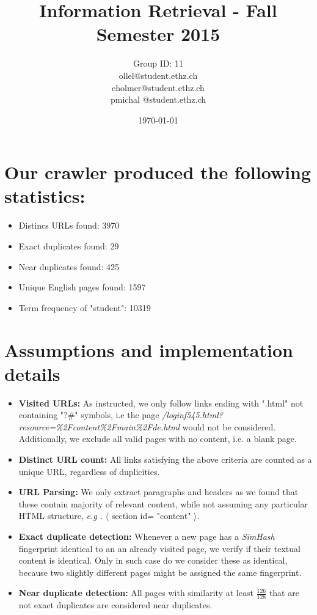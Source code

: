 \documentclass[a4paper, 11pt]{article}
\begin{document}
\title{Information Retrieval - Fall Semester 2015}
\author{Group ID: 11 \\ ollel@student.ethz.ch\\ eholmer@student.ethz.ch\\ pmichal
@student.ethz.ch\\}
\date{\today}
\maketitle

\section*{Our crawler produced the following statistics: } 
\begin{itemize}
  \item Distincs URLs found: 3970
  \item Exact duplicates found: 29
  \item Near duplicates found: 425
  \item Unique English pages found: 1597
  \item Term frequency of "student": 10319
\end{itemize}

\section*{Assumptions and implementation details }

\begin{itemize}
  \item \textbf{Visited URLs:} As instructed, we only follow links ending with ".html" not containing "?\#" symbols, i.e the page \textit{/loginf545.html?resource=\%2Fcontent\%2Fmain\%2Fde.html} would not be considered. Additionally, we exclude all valid pages with no content, i.e. a blank page.
  
 \item \textbf{Distinct URL count:} All links satisfying the above criteria are counted as a unique URL, regardless of duplicities.
  
  \item \textbf{URL Parsing:} We only extract paragraphs and headers as we found that these contain majority of relevant content, while not assuming any particular HTML structure, \textit{e.g
  .} $\langle$ section id= "content" $\rangle$.
  
  \item \textbf{Exact duplicate detection:} Whenever a new page has a \textit{SimHash} fingerprint identical to an an already visited page, we verify if their textual content is identical. Only in such case do we consider these as identical, because two slightly different pages might be assigned the same fingerprint.
  
  \item \textbf{Near duplicate detection:} All pages with similarity at least $\frac{126}{128}$ that are not exact duplicates are considered near duplicates.
  
  
\end{itemize}
\end{document}
